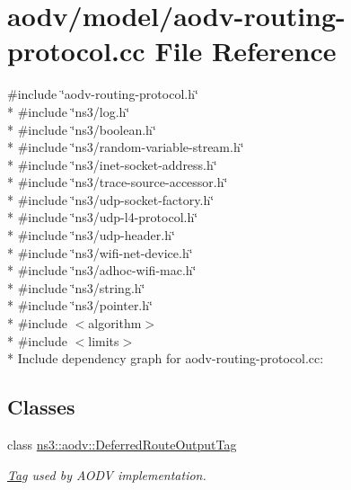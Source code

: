 \hypertarget{aodv-routing-protocol_8cc}{}\section{aodv/model/aodv-\/routing-\/protocol.cc File Reference}
\label{aodv-routing-protocol_8cc}
{\ttfamily \#include \char`\"{}aodv-\/routing-\/protocol.\+h\char`\"{}}\\*
{\ttfamily \#include \char`\"{}ns3/log.\+h\char`\"{}}\\*
{\ttfamily \#include \char`\"{}ns3/boolean.\+h\char`\"{}}\\*
{\ttfamily \#include \char`\"{}ns3/random-\/variable-\/stream.\+h\char`\"{}}\\*
{\ttfamily \#include \char`\"{}ns3/inet-\/socket-\/address.\+h\char`\"{}}\\*
{\ttfamily \#include \char`\"{}ns3/trace-\/source-\/accessor.\+h\char`\"{}}\\*
{\ttfamily \#include \char`\"{}ns3/udp-\/socket-\/factory.\+h\char`\"{}}\\*
{\ttfamily \#include \char`\"{}ns3/udp-\/l4-\/protocol.\+h\char`\"{}}\\*
{\ttfamily \#include \char`\"{}ns3/udp-\/header.\+h\char`\"{}}\\*
{\ttfamily \#include \char`\"{}ns3/wifi-\/net-\/device.\+h\char`\"{}}\\*
{\ttfamily \#include \char`\"{}ns3/adhoc-\/wifi-\/mac.\+h\char`\"{}}\\*
{\ttfamily \#include \char`\"{}ns3/string.\+h\char`\"{}}\\*
{\ttfamily \#include \char`\"{}ns3/pointer.\+h\char`\"{}}\\*
{\ttfamily \#include $<$algorithm$>$}\\*
{\ttfamily \#include $<$limits$>$}\\*
Include dependency graph for aodv-\/routing-\/protocol.cc\+:
\subsection*{Classes}
\begin{DoxyCompactItemize}
\item 
class \hyperlink{classns3_1_1aodv_1_1DeferredRouteOutputTag}{ns3\+::aodv\+::\+Deferred\+Route\+Output\+Tag}
\begin{DoxyCompactList}\small\item\em \hyperlink{classns3_1_1Tag}{Tag} used by A\+O\+DV implementation. \end{DoxyCompactList}\end{DoxyCompactItemize}

